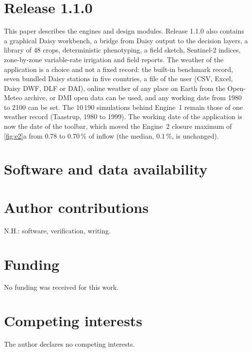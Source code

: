\section*{Release 1.1.0}
This paper describes the engines and design modules. Release 1.1.0 also contains a graphical Daisy workbench, a bridge from Daisy output to the decision layers, a library of 48 crops, deterministic phenotyping, a field sketch, Sentinel-2 indices, zone-by-zone variable-rate irrigation and field reports. The weather of the application is a choice and not a fixed record: the built-in benchmark record, seven bundled Daisy stations in five countries, a file of the user (CSV, Excel, Daisy DWF, DLF or DAI), online weather of any place on Earth from the Open-Meteo archive, or DMI open data can be used, and any working date from 1980 to 2100 can be set. The 10\,190 simulations behind Engine~1 remain those of one weather record (Taastrup, 1980 to 1999). The working date of the application is now the date of the toolbar, which moved the Engine~2 closure maximum of \cref{fig:e2}a from 0.78 to 0.70\,\% of inflow (the median, 0.1\,\%, is unchanged).

\section*{Software and data availability}
\softavail

\section*{Author contributions}
N.H.: software, verification, writing.

\section*{Funding}
No funding was received for this work.

\section*{Competing interests}
The author declares no competing interests.



\appendix
